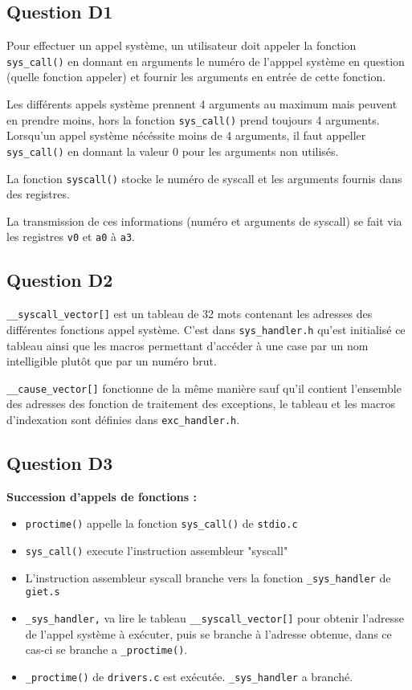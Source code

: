 \documentclass{article}
\begin{document}
\subsection{Question D1}

Pour effectuer un appel système, un utilisateur doit appeler la fonction
\texttt{sys\_call()} en donnant en arguments le numéro de l'apppel système en
question (quelle fonction appeler) et fournir les arguments en entrée
de cette fonction.

Les différents appels système prennent 4 arguments au maximum mais peuvent
en prendre moins, hors la fonction \texttt{sys\_call()} prend toujours 4 arguments.
Lorsqu'un appel système nécéssite moins de 4 arguments, il faut appeller
\texttt{sys\_call()} en donnant la valeur 0 pour les arguments non utilisés.

La fonction \texttt{syscall()} stocke le numéro de syscall et les arguments fournis
dans des registres. 

La transmission de ces informations (numéro et arguments de syscall)
se fait via les registres \texttt{v0} et \texttt{a0} à \texttt{a3}.

\subsection{Question D2}

\texttt{\_\_syscall\_vector[]} est un tableau de 32 mots contenant les adresses
des différentes fonctions appel système. C'est dans \texttt{sys\_handler.h} 
qu'est initialisé ce tableau ainsi que les macros permettant d'accéder à une
case par un nom intelligible plutôt que par un numéro brut.

\texttt{\_\_cause\_vector[]} fonctionne de la même manière sauf qu'il contient
l'ensemble des adresses des fonction de traitement des exceptions,
le tableau et les macros d'indexation sont définies dans \texttt{exc\_handler.h}.

\subsection{Question D3}

\textbf{Succession d'appels de fonctions :}
\begin{itemize}
\item \texttt{proctime()} appelle la fonction \texttt{sys\_call()} de \texttt{stdio.c}
\item \texttt{sys\_call()} execute l'instruction assembleur "syscall"
\item L'instruction assembleur syscall branche vers la fonction \texttt{\_sys\_handler} de \texttt{giet.s}
\item \texttt{\_sys\_handler,} va lire le tableau \texttt{\_\_syscall\_vector[]} pour obtenir
	l'adresse de l'appel système à exécuter, puis se branche à l'adresse obtenue, dans ce cas-ci
	se branche a \texttt{\_proctime()}.
\item \texttt{\_proctime()} de \texttt{drivers.c} est exécutée.
\texttt{\_sys\_handler} a branché.
\end{itemize}
\end{document}

